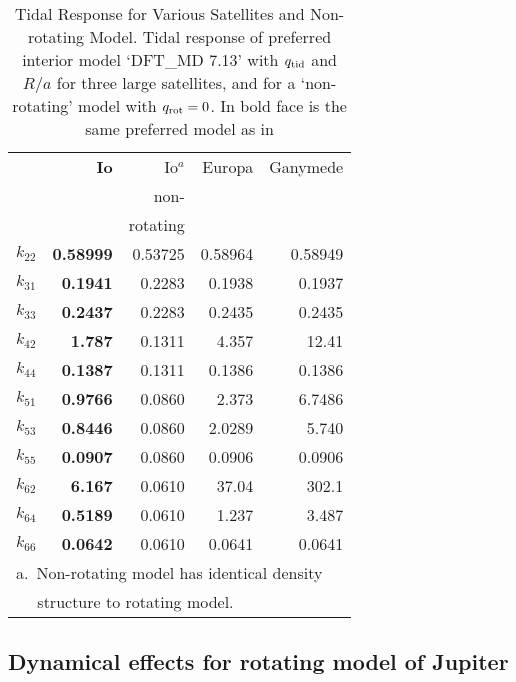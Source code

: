 \begin{table}
\centering

\caption{Tidal Response for Various Satellites and Non-rotating Model. Tidal response of preferred interior model `DFT\_MD 7.13' with
    $q_{\rm tid}$ and $R/a$ for three large satellites, and for a `non-rotating'
    model with $q_{\rm rot}=0$. In bold face is the same preferred model as in
    \label{tab:satellite_harmonics} }
\begin{tabular}{l|rrrr}
    \hline
    {} & {\bf Io} & {Io$^a$} &
    {Europa} & {Ganymede} \\
    {}  &  {} &
    {non-} & {} & {} \\
    {}  &  {} & {rotating} & \\
    \hline
    $k_{22}$  &  {\bf  0.58999}  &  0.53725  &  0.58964  &  0.58949  \\
    $k_{31}$  &  {\bf  0.1941}   &  0.2283   &  0.1938   &  0.1937   \\
    $k_{33}$  &  {\bf  0.2437}   &  0.2283   &  0.2435   &  0.2435   \\
    $k_{42}$  &  {\bf  1.787}    &  0.1311   &  4.357    &  12.41    \\
    $k_{44}$  &  {\bf  0.1387}   &  0.1311   &  0.1386   &  0.1386   \\
    $k_{51}$  &  {\bf  0.9766}   &  0.0860   &  2.373    &  6.7486   \\
    $k_{53}$  &  {\bf  0.8446}   &  0.0860   &  2.0289   &  5.740    \\
    $k_{55}$  &  {\bf  0.0907}   &  0.0860   &  0.0906   &  0.0906   \\
    $k_{62}$  &  {\bf  6.167}    &  0.0610   &  37.04    &  302.1    \\
    $k_{64}$  &  {\bf  0.5189}   &  0.0610   &  1.237    &  3.487    \\
    $k_{66}$  &  {\bf  0.0642}   &  0.0610   &  0.0641   &  0.0641   \\
    \hline
    \multicolumn{5}{l}{a.~Non-rotating model has identical density }\\
    \multicolumn{5}{l}{~~ structure to rotating model.}
\end{tabular}

\end{table}

\subsection{ Dynamical effects for rotating model of Jupiter}

